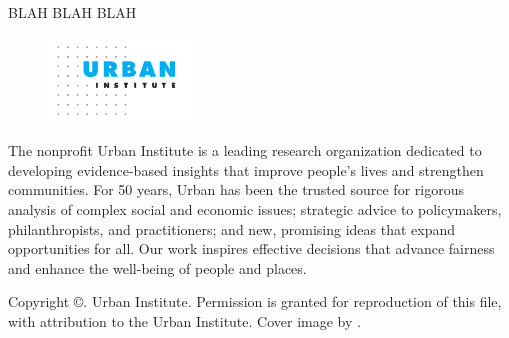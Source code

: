 \documentclass{urban-formatting}
\begin{document}
BLAH BLAH BLAH

\newpage
\thispagestyle{empty} %
\begin{figure}
    \includegraphics[width=1.5in]{images/logo.png}
\end{figure}
\vspace*{-0.35in}


The nonprofit Urban Institute is a leading research organization dedicated to developing evidence-based insights that improve people’s lives and strengthen communities. For 50 years, Urban has been the trusted source for rigorous analysis of complex social and economic issues; strategic advice to policymakers, philanthropists, and practitioners; and new, promising ideas that expand opportunities for all. Our work inspires effective decisions that advance fairness and enhance the well-being of people and places.

\vspace*{\fill}
\noindent Copyright ©. Urban Institute. Permission is granted for reproduction of this file, with attribution to the Urban Institute. Cover image by .
\end{document}
